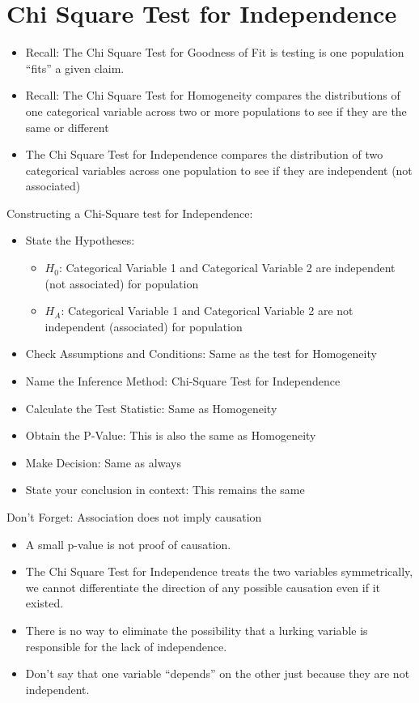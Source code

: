 \documentclass[../stats.tex]{subfiles}
\begin{document}
\section{Chi Square Test for Independence}
\begin{itemize}
    \item Recall: The Chi Square Test for Goodness of Fit is testing is one population ``fits'' a given claim.
    \item Recall: The Chi Square Test for Homogeneity compares the distributions of one categorical variable across two or more populations to see if they are the same or different 
    \item The Chi Square Test for Independence compares the distribution of two categorical variables across one population to see if they are independent (not associated)
\end{itemize}

Constructing a Chi-Square test for Independence:
\begin{itemize}
    \item State the Hypotheses:
    \begin{itemize}
        \item $H_0$: {Categorical Variable 1} and {Categorical Variable 2} are independent (not associated) for {population}
        \item $H_A$: {Categorical Variable 1} and {Categorical Variable 2} are not independent (associated) for {population}
    \end{itemize}
    \item Check Assumptions and Conditions: Same as the test for Homogeneity
    \item Name the Inference Method: Chi-Square Test for Independence
    \item Calculate the Test Statistic: Same as Homogeneity
    \item Obtain the P-Value: This is also the same as Homogeneity
    \item Make Decision: Same as always 
    \item State your conclusion in context: This remains the same 
\end{itemize}

Don't Forget: Association does not imply causation 
\begin{itemize}
    \item A small p-value is not proof of causation.
    \item The Chi Square Test for Independence treats the two variables symmetrically, we cannot differentiate the direction of any possible causation even if it existed.
    \item There is no way to eliminate the possibility that a lurking variable is responsible for the lack of independence.
    \item Don't say that one variable ``depends'' on the other just because they are not independent.
\end{itemize}
\end{document}

